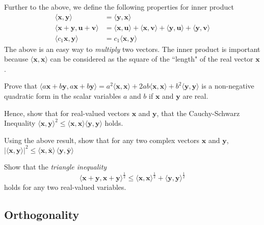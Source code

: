 Further to the above, we define the following properties for inner product
%
\begin{subequations}
	\begin{align}
	\langle \bm{x}, \bm{y} \rangle &= 	\langle \bm{y}, \bm{x} \rangle \\
	\langle \bm{x} + \bm{y},  \bm{u} + \bm{v}\rangle &= \langle \bm{x}, \bm{u} \rangle  + \langle \bm{x}, \bm{v} \rangle + \langle \bm{y}, \bm{u} \rangle + \langle \bm{y}, \bm{v} \rangle \\
	\langle c_1 \bm{x}, \bm{y} \rangle &= c_1 \langle \bm{x}, \bm{y} \rangle
	\end{align}
\end{subequations}
%
The above is an easy way to \textit{multiply} two vectors. The inner product is important because $\langle \bm{x}, \bm{x} \rangle$ can be considered as the square of the ``length" of the real vector $\bm{x}$. 
%
\begin{homework}
	Prove that $\langle a\bm{x}+b \bm{y}, a\bm{x}+b \bm{y} \rangle = a^2 \langle \bm{x}, \bm{x} \rangle + 2 ab \langle \bm{x}, \bm{x} \rangle  + b^2 \langle \bm{y}, \bm{y} \rangle $ is a non-negative quadratic form in the scalar variables $a$ and $b$ if $\bm{x}$ and $\bm{y}$ are real.
\end{homework}
%
\begin{homework}
	Hence, show that for real-valued vectors $\bm{x}$ and $\bm{y}$, that the Cauchy-Schwarz Inequality $\langle \bm{x}, \bm{y} \rangle^2 \le  \langle \bm{x}, \bm{x} \rangle \langle \bm{y}, \bm{y} \rangle$ holds.
\end{homework}
%
\begin{homework}
	Using the above result, show that  for any two complex vectors $\bm{x}$  and $\bm{y}$, $|\langle \bm{x}, \bm{y}\rangle|^2 \le \langle \bm{x}, \bar{\bm{x}}\rangle \, \langle \bm{y}, \bar{\bm{y}}\rangle$
\end{homework}
%
\begin{homework}
	Show that the \textit{triangle inequality} 
	\[
		\langle \bm{x}+ \bm{y}, \bm{x}+ \bm{y} \rangle^{\frac{1}{2}} \le \langle \bm{x}, \bm{x} \rangle^{\frac{1}{2}}  + \langle  \bm{y},  \bm{y} \rangle^{\frac{1}{2}} 
	\]
	holds for any two real-valued variables.
\end{homework}

\subsection{Orthogonality}

